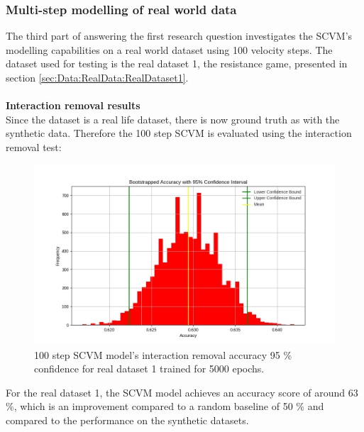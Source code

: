 \subsubsection{Multi-step modelling of real world data}
\label{sec:ResearchQuestion1:ResistanceTraining}
The third part of answering the first research question investigates the SCVM's modelling capabilities on a real world dataset using 100 velocity steps. 
The dataset used for testing is the real dataset 1, the resistance game, presented in section \ref{sec:Data:RealData:RealDataset1}.
\\\\
\textbf{Interaction removal results}
\\
Since the dataset is a real life dataset, there is now ground truth as with the synthetic data. Therefore the 100 step SCVM is evaluated using the interaction removal test:
\begin{figure}[H]
    \centering
    \includegraphics[width=\textwidth]{0_images/100steps_SCVM_real_dataset_accuracy_plot.png}
    \caption{100 step SCVM model's interaction removal accuracy 95 \% confidence for real dataset 1 trained for 5000 epochs.}
    \label{fig:RQ1:SCVM_accuracy}
\end{figure}
\noindent
For the real dataset 1, the SCVM model achieves an accuracy score of around 63 \%, which is an improvement compared to a random baseline of 50 \% and compared to the performance on the synthetic datasets.
